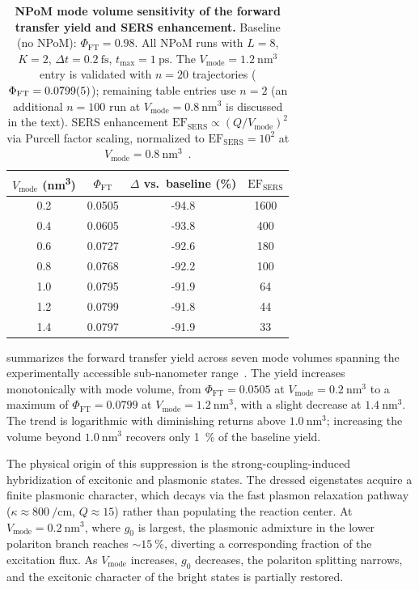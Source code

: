 \documentclass[preprint,12pt]{elsarticle}
\begin{document}
\begin{table}[htbp]
\centering
\caption{\textbf{NPoM mode volume sensitivity of the forward transfer yield and SERS enhancement.}
Baseline (no NPoM): $\Phi_{\mathrm{FT}} = 0.98$. All NPoM runs with $L=8$, $K=2$, $\Delta t = \qty{0.2}{\fs}$, $t_{\mathrm{max}} = \qty{1}{\ps}$. The $V_{\mathrm{mode}} = \qty{1.2}{\nm\cubed}$ entry is validated with $n=20$ trajectories ($\Phi_{\mathrm{FT}} = \num{0.0799 \pm 0.0005}$); remaining table entries use $n=2$ (an additional $n=100$ run at $V_{\mathrm{mode}} = \qty{0.8}{\nm\cubed}$ is discussed in the text). SERS enhancement $\mathrm{EF}_{\mathrm{SERS}} \propto (Q/V_{\mathrm{mode}})^2$ via Purcell factor scaling, normalized to $\mathrm{EF}_{\mathrm{SERS}} = 10^2$ at $V_{\mathrm{mode}} = \qty{0.8}{\nm\cubed}$~\cite{Chikkaraddy2016}.}
\label{tab:npom_volume_scan}
\begin{tabular}{S[table-format=1.1] S[table-format=1.4] S[table-format=-2.1] S[table-format=4.0]}
\toprule
{$V_{\mathrm{mode}}$ (\unit{\nm\cubed})} & {$\Phi_{\mathrm{FT}}$} & {$\Delta$ vs.\ baseline (\unit{\percent})} & {$\mathrm{EF}_{\mathrm{SERS}}$} \\
  & 0.0505 & -94.8 & 1600 \\
0.4  & 0.0605 & -93.8 & 400 \\
0.6  & 0.0727 & -92.6 & 180 \\
0.8  & 0.0768 & -92.2 & 100 \\
1.0  & 0.0795 & -91.9 & 64 \\
1.2  & 0.0799 & -91.8 & 44 \\
1.4  & 0.0797 & -91.9 & 33 \\
\bottomrule
\end{tabular}
\end{table}

 summarizes the forward transfer yield across seven mode volumes spanning the experimentally accessible sub-nanometer range~\cite{Chikkaraddy2016}.
The yield increases monotonically with mode volume, from $\Phi_{\mathrm{FT}} = 0.0505$ at $V_{\mathrm{mode}} = \qty{0.2}{\nm\cubed}$ to a maximum of $\Phi_{\mathrm{FT}} = 0.0799$ at $V_{\mathrm{mode}} = \qty{1.2}{\nm\cubed}$, with a slight decrease at $\qty{1.4}{\nm\cubed}$.
The trend is logarithmic with diminishing returns above $\qty{1.0}{\nm\cubed}$; increasing the volume beyond $\qty{1.0}{\nm\cubed}$ recovers only \qty{1}{\percent} of the baseline yield.

The physical origin of this suppression is the strong-coupling-induced hybridization of excitonic and plasmonic states.
The dressed eigenstates acquire a finite plasmonic character, which decays via the fast plasmon relaxation pathway ($\kappa \approx \qty{800}{\per\cm}$, $Q \approx 15$) rather than populating the reaction center.
At $V_{\mathrm{mode}} = \qty{0.2}{\nm\cubed}$, where $g_0$ is largest, the plasmonic admixture in the lower polariton branch reaches $\sim \qty{15}{\percent}$, diverting a corresponding fraction of the excitation flux.
As $V_{\mathrm{mode}}$ increases, $g_0$ decreases, the polariton splitting narrows, and the excitonic character of the bright states is partially restored.
\end{document}
